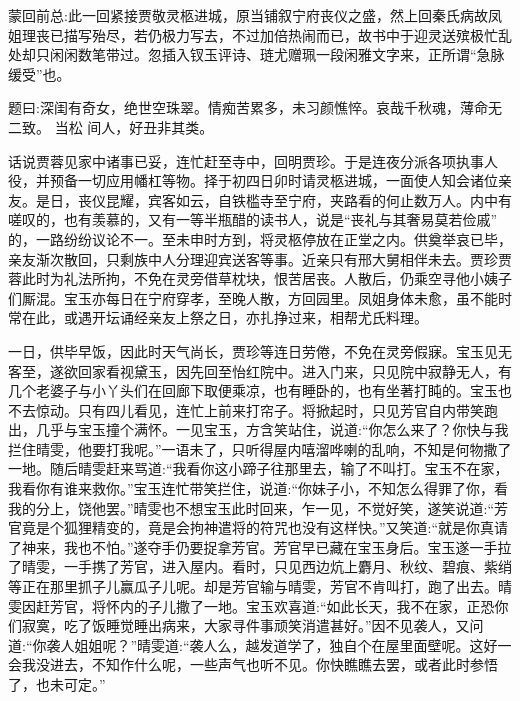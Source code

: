 

\begin{parag}
    \begin{note}蒙回前总:此一回紧接贾敬灵柩进城，原当铺叙宁府丧仪之盛，然上回秦氏病故凤姐理丧已描写殆尽，若仍极力写去，不过加倍热闹而已，故书中于迎灵送殡极忙乱处却只闲闲数笔带过。忽插入钗玉评诗、琏尤赠珮一段闲雅文字来，正所谓“急脉缓受”也。\end{note}
\end{parag}


\begin{parag}
    \begin{note}题曰:深闺有奇女，绝世空珠翠。情痴苦累多，未习颜憔悴。哀哉千秋魂，薄命无二致。 当松 间人，好丑非其类。\end{note}
\end{parag}



\begin{parag}
    话说贾蓉见家中诸事已妥，连忙赶至寺中，回明贾珍。于是连夜分派各项执事人役，并预备一切应用幡杠等物。择于初四日卯时请灵柩进城，一面使人知会诸位亲友。是日，丧仪昆耀，宾客如云，自铁槛寺至宁府，夹路看的何止数万人。内中有嗟叹的，也有羡慕的，又有一等半瓶醋的读书人，说是“丧礼与其奢易莫若俭戚” 的，一路纷纷议论不一。至未申时方到，将灵柩停放在正堂之内。供奠举哀已毕，亲友渐次散回，只剩族中人分理迎宾送客等事。近亲只有邢大舅相伴未去。贾珍贾蓉此时为礼法所拘，不免在灵旁借草枕块，恨苦居丧。人散后，仍乘空寻他小姨子们厮混。宝玉亦每日在宁府穿孝，至晚人散，方回园里。凤姐身体未愈，虽不能时常在此，或遇开坛诵经亲友上祭之日，亦扎挣过来，相帮尤氏料理。
\end{parag}


\begin{parag}
    一日，供毕早饭，因此时天气尚长，贾珍等连日劳倦，不免在灵旁假寐。宝玉见无客至，遂欲回家看视黛玉，因先回至怡红院中。进入门来，只见院中寂静无人，有几个老婆子与小丫头们在回廊下取便乘凉，也有睡卧的，也有坐著打盹的。宝玉也不去惊动。只有四儿看见，连忙上前来打帘子。将掀起时，只见芳官自内带笑跑出，几乎与宝玉撞个满怀。一见宝玉，方含笑站住，说道:“你怎么来了？你快与我拦住晴雯，他要打我呢。”一语未了，只听得屋内嘻溜哗喇的乱响，不知是何物撒了一地。随后晴雯赶来骂道:“我看你这小蹄子往那里去，输了不叫打。宝玉不在家，我看你有谁来救你。”宝玉连忙带笑拦住，说道:“你妹子小，不知怎么得罪了你，看我的分上，饶他罢。”晴雯也不想宝玉此时回来，乍一见，不觉好笑，遂笑说道:“芳官竟是个狐狸精变的，竟是会拘神遣将的符咒也没有这样快。”又笑道:“就是你真请了神来，我也不怕。”遂夺手仍要捉拿芳官。芳官早已藏在宝玉身后。宝玉遂一手拉了晴雯，一手携了芳官，进入屋内。看时，只见西边炕上麝月、秋纹、碧痕、紫绡等正在那里抓子儿赢瓜子儿呢。却是芳官输与晴雯，芳官不肯叫打，跑了出去。晴雯因赶芳官，将怀内的子儿撒了一地。宝玉欢喜道:“如此长天，我不在家，正恐你们寂寞，吃了饭睡觉睡出病来，大家寻件事顽笑消遣甚好。”因不见袭人，又问道:“你袭人姐姐呢？”晴雯道:“袭人么，越发道学了，独自个在屋里面壁呢。这好一会我没进去，不知作什么呢，一些声气也听不见。你快瞧瞧去罢，或者此时参悟了，也未可定。”
\end{parag}


